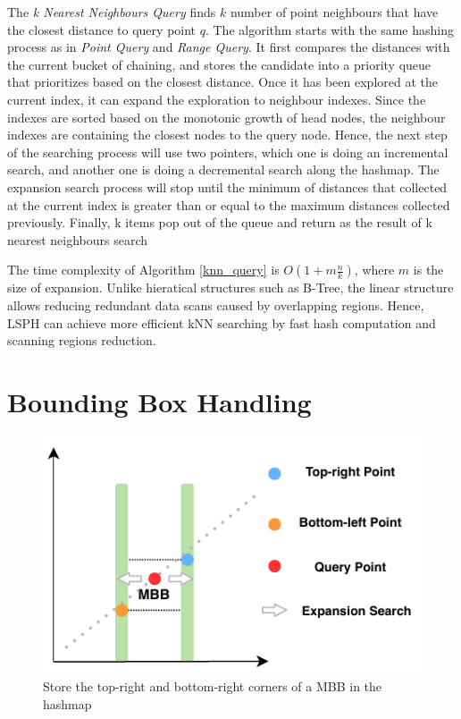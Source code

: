 The \textit{k Nearest Neighbours Query} finds $k$ number of point neighbours that have the closest distance to query point $q$. The algorithm starts with the same hashing process as in \textit{Point Query} and \textit{Range Query}. It first compares the distances with the current bucket of chaining, and stores the candidate into a priority queue that prioritizes based on the closest distance. Once it has been explored at the current index, it can expand the exploration to neighbour indexes. Since the indexes are sorted based on the monotonic growth of head nodes, the neighbour indexes are containing the closest nodes to the query node. Hence, the next step of the searching process will use two pointers, which one is doing an incremental search, and another one is doing a decremental search along the hashmap. The expansion search process will stop until the minimum of distances that collected at the current index is greater than or equal to the maximum distances collected previously.  Finally, k items pop out of the queue and return as the result of k nearest neighbours search

The time complexity of Algorithm \ref{knn_query} is $O(1 + m\frac{n}{k})$, where $m$ is the size of expansion. Unlike hieratical structures such as B-Tree, the linear structure allows reducing redundant data scans caused by overlapping regions. Hence, LSPH can achieve more efficient kNN searching by fast hash computation and scanning regions reduction. 

\section{Bounding Box Handling}

\begin{figure}[ht]
\centering
\includegraphics{Figures/object.pdf}
\caption{Store the top-right and bottom-right corners of a MBB in the hashmap}
\label{fig:object}
\end{figure}

